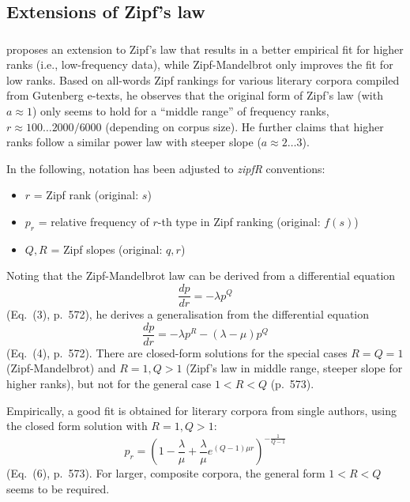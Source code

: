 \documentclass[a4paper]{article}
\begin{document}
\subsection{Extensions of Zipf's law}
\label{sec:lit:extensions}

\subsubsection{\cite{Montemurro:01}}
\label{sec:lit:ext:Montemurro2001}

\citet{Montemurro:01} proposes an extension to Zipf's law that results in a better empirical fit for higher ranks (i.e., low-frequency data), while Zipf-Mandelbrot only improves the fit for low ranks.  Based on all-words Zipf rankings for various literary corpora compiled from Gutenberg e-texts, he observes that the original form of Zipf's law (with $a\approx 1$) only seems to hold for a ``middle range'' of frequency ranks, $r\approx 100 \ldots 2000 / 6000$ (depending on corpus size).  He further claims that higher ranks follow a similar power law with steeper slope ($a \approx 2 \ldots 3$).

In the following, notation has been adjusted to \emph{zipfR} conventions:
\begin{itemize}
\item $r$ = Zipf rank (original: $s$)
\item $p_r$ = relative frequency of $r$-th type in Zipf ranking (original: $f(s)$)
\item $Q, R$ = Zipf slopes (original: $q, r$) 
\end{itemize}

Noting that the Zipf-Mandelbrot law can be derived from a differential equation
\begin{equation}
  \label{eq:lit:ext:Montemurro2001:1}
  \frac{dp}{dr} = -\lambda p^Q
\end{equation}
(Eq.~(3), p.~572), he derives a generalisation from the differential equation
\begin{equation}
  \label{eq:lit:ext:Montemurro2001:2}
  \frac{dp}{dr} = -\lambda p^R - (\lambda - \mu) p^Q
\end{equation}
(Eq.~(4), p.~572).  There are closed-form solutions for the special cases $R = Q = 1$ (Zipf-Mandelbrot) and $R = 1, Q > 1$ (Zipf's law in middle range, steeper slope for higher ranks), but not for the general case $1 < R < Q$ (p.~573).  

Empirically, a good fit is obtained for literary corpora from single authors, using the closed form solution with $R = 1, Q > 1$:
\begin{equation}
  \label{eq:lit:ext:Montemurro2001:3}
  p_r = \left( 1 - \frac{\lambda}{\mu} + \frac{\lambda}{\mu} e^{(Q-1) \mu r} \right)^{-\frac1{Q-1}}
\end{equation}
(Eq.~(6), p.~573).  For larger, composite corpora, the general form $1 < R < Q$ seems to be required.
\end{document}
